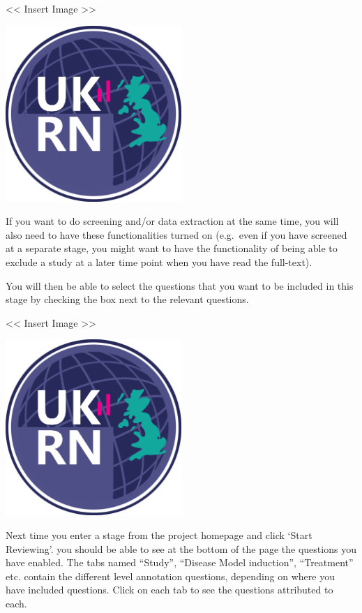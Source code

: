 \documentclass[
]{book}
\begin{document}
\textless{}\textless{} Insert Image \textgreater{}\textgreater{}

\includegraphics[width=0.5\textwidth,height=0.5\textheight]{figs/evidence-triangle.png}

If you want to do screening and/or data extraction at the same time, you will also need to have these functionalities turned on (e.g.~even if you have screened at a separate stage, you might want to have the functionality of being able to exclude a study at a later time point when you have read the full-text).

You will then be able to select the questions that you want to be included in this stage by checking the box next to the relevant questions.

\textless{}\textless{} Insert Image \textgreater{}\textgreater{}

\includegraphics[width=0.5\textwidth,height=0.5\textheight]{figs/evidence-triangle.png}

Next time you enter a stage from the project homepage and click `Start Reviewing'. you should be able to see at the bottom of the page the questions you have enabled. The tabs named ``Study'', ``Disease Model induction'', ``Treatment'' etc. contain the different level annotation questions, depending on where you have included questions. Click on each tab to see the questions attributed to each.
\end{document}
